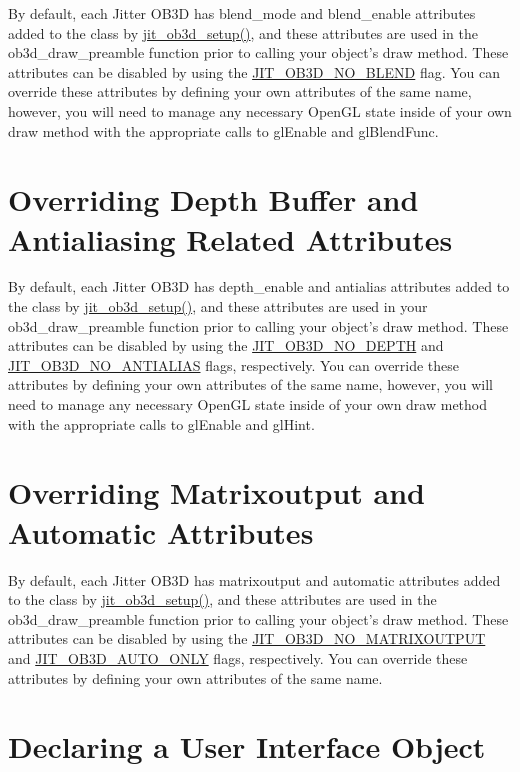 By default, each Jitter OB3D has blend\_\-mode and blend\_\-enable attributes added to the class by \hyperlink{group__ob3dmod_gaee60152a1d507a630e14f0e4f71e86f2}{jit\_\-ob3d\_\-setup()}, and these attributes are used in the ob3d\_\-draw\_\-preamble function prior to calling your object's draw method. These attributes can be disabled by using the \hyperlink{group__jitter_gab4407b5b96c0744f03bec69e204b56bb}{JIT\_\-OB3D\_\-NO\_\-BLEND} flag. You can override these attributes by defining your own attributes of the same name, however, you will need to manage any necessary OpenGL state inside of your own draw method with the appropriate calls to glEnable and glBlendFunc.\hypertarget{chapter_jit_ob3ddetails_chapter_jit_ob3ddetails_aa}{}\section{Overriding Depth Buffer and Antialiasing Related Attributes}\label{chapter_jit_ob3ddetails_chapter_jit_ob3ddetails_aa}
By default, each Jitter OB3D has depth\_\-enable and antialias attributes added to the class by \hyperlink{group__ob3dmod_gaee60152a1d507a630e14f0e4f71e86f2}{jit\_\-ob3d\_\-setup()}, and these attributes are used in your ob3d\_\-draw\_\-preamble function prior to calling your object's draw method. These attributes can be disabled by using the \hyperlink{group__jitter_gad4a2b2f395618bafbd7faca61106b9f7}{JIT\_\-OB3D\_\-NO\_\-DEPTH} and \hyperlink{group__jitter_ga2ef1435359d9dca4722fb71db4b0d423}{JIT\_\-OB3D\_\-NO\_\-ANTIALIAS} flags, respectively. You can override these attributes by defining your own attributes of the same name, however, you will need to manage any necessary OpenGL state inside of your own draw method with the appropriate calls to glEnable and glHint.\hypertarget{chapter_jit_ob3ddetails_chapter_jit_ob3ddetails_matout}{}\section{Overriding Matrixoutput and Automatic Attributes}\label{chapter_jit_ob3ddetails_chapter_jit_ob3ddetails_matout}
By default, each Jitter OB3D has matrixoutput and automatic attributes added to the class by \hyperlink{group__ob3dmod_gaee60152a1d507a630e14f0e4f71e86f2}{jit\_\-ob3d\_\-setup()}, and these attributes are used in the ob3d\_\-draw\_\-preamble function prior to calling your object's draw method. These attributes can be disabled by using the \hyperlink{group__jitter_ga015276252d0ad61f9f35ad1ea227d089}{JIT\_\-OB3D\_\-NO\_\-MATRIXOUTPUT} and \hyperlink{group__jitter_ga63a89334c5c06f92792333d191b71b06}{JIT\_\-OB3D\_\-AUTO\_\-ONLY} flags, respectively. You can override these attributes by defining your own attributes of the same name.\hypertarget{chapter_jit_ob3ddetails_chapter_jit_ob3ddetails_ui}{}\section{Declaring a User Interface Object}\label{chapter_jit_ob3ddetails_chapter_jit_ob3ddetails_ui}

